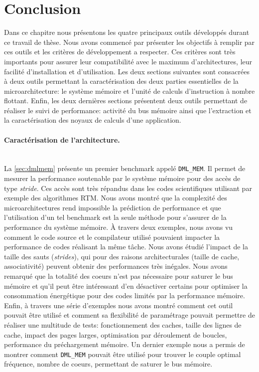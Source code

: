 \section{Conclusion}\label{sec:dev_conclusion}
    
    Dans ce chapitre nous présentons les quatre principaux outils développés durant ce travail de thèse. Nous avons commencé par présenter les objectifs à remplir par ces outils et les critères de développement a respecter. Ces critères sont très importants pour assurer leur compatibilité avec le maximum d'architectures, leur facilité d'installation et d'utilisation. 
    Les deux sections suivantes sont consacrées à deux outils permettant la caractérisation des deux parties essentielles de la microarchitecture: le système mémoire et l'unité de calculs d'instruction à nombre flottant. Enfin, les deux dernières sections présentent deux outils permettant de réaliser le suivi de performance: activité du bus mémoire ainsi que l'extraction et la caractérisation des noyaux de calculs d'une application.

\paragraph{Caractérisation de l'architecture.}
~\\
    
    La \autoref{sec:dmlmem} présente un premier benchmark appelé \verb|DML_MEM|. Il permet de mesurer la performance soutenable par le système  mémoire pour des accès de type \textit{stride}. Ces accès sont très répandus dans les codes scientifiques utilisant par exemple des algorithmes RTM. Nous avons montré que la complexité des microarchitectures rend impossible la prédiction de performance et que l'utilisation d'un tel benchmark est la seule méthode pour s'assurer de la performance du système mémoire. À travers deux exemples, nous avons vu comment le code source et le compilateur utilisé pouvaient impacter la performance de codes réalisant la même tâche. Nous avons étudié l'impact de la taille des sauts (\textit{strides}), qui pour des raisons architecturales (taille de cache, associativité) peuvent obtenir des performances très inégales. Nous avons remarqué que la totalité des coeurs n'est pas nécessaire pour saturer le bus mémoire et qu'il peut être intéressant d'en désactiver certains pour optimiser la consommation énergétique pour des codes limités par la performance mémoire. Enfin, à travers une série d'exemples nous avons montré comment cet outil pouvait être utilisé et comment sa flexibilité de paramétrage pouvait permettre de réaliser une multitude de tests: fonctionnement des caches, taille des lignes de cache, impact des pages larges, optimisation par déroulement de boucles, performance du préchargement mémoire. Un dernier exemple nous a permis de montrer comment \verb|DML_MEM| pouvait être utilisé pour trouver le couple optimal {fréquence, nombre de coeurs}, permettant de saturer le bus mémoire.\\
    
